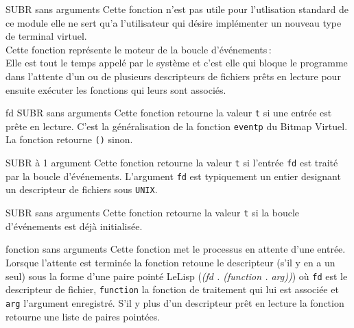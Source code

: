  {} {SUBR sans arguments}
Cette fonction n'est pas utile pour l'utlisation standard de ce module
 elle ne sert qu'a l'utilisateur qui d\'{e}sire impl\'{e}menter un nouveau type
de terminal virtuel.\\
Cette fonction repr\'{e}sente le moteur de la boucle d'\'{e}v\'{e}nements\,:\\
Elle est tout le temps appel\'{e} par le syst\`{e}me  et c'est elle 
qui bloque le programme dans l'attente d'un ou de plusieurs descripteurs
de fichiers pr\^{e}ts en lecture pour ensuite ex\'{e}cuter les
fonctions  qui leurs sont associ\'{e}s.

 {fd} {SUBR sans arguments}
Cette fonction retourne la valeur {\tt t} si une entr\'{e}e est pr\^{e}te en
lecture. C'est la g\'{e}n\'{e}ralisation de la fonction {\tt eventp} du Bitmap 
Virtuel. La fonction retourne {\tt ()}  sinon.

 {} {SUBR \`{a} 1 argument}
Cette fonction retourne la valeur {\tt t} si l'entr\'{e}e {\tt fd} est trait\'{e} par
la boucle d'\'{e}v\'{e}nements. L'argument {\tt fd} est typiquement un entier 
designant un descripteur de fichiers sous {\tt UNIX}.


 {} {SUBR sans  arguments}
Cette fonction retourne  la valeur {\tt t} si la boucle d'\'{e}v\'{e}nements est
d\'{e}j\`{a} initialis\'{e}e.


 {} {fonction sans arguments}
Cette fonction met le processus en attente d'une entr\'{e}e.\\
Lorsque l'attente est termin\'{e}e la fonction retoune le descripteur
 (s'il y en a un seul) sous la forme d'une paire point\'{e} LeLisp 
({\em (fd . (function . arg))}) o\`{u}  {\tt fd} est le descripteur de fichier,
 {\tt function} la fonction de traitement qui lui est associ\'{e}e et 
{\tt arg} l'argument enregistr\'{e}.
S'il y plus d'un descripteur pr\^{e}t en lecture la fonction retourne une
liste de paires point\'{e}es.

